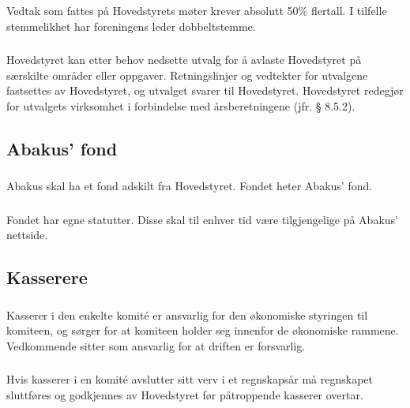 \subsubsection{}
Vedtak som fattes på Hovedstyrets møter krever absolutt 50\% flertall. I
tilfelle stemmelikhet har foreningens leder dobbeltstemme.

\subsubsection{}
Hovedstyret kan etter behov nedsette utvalg for å avlaste Hovedstyret på
særskilte områder eller oppgaver. Retningslinjer og vedtekter for utvalgene
fastsettes av Hovedstyret, og utvalget svarer til Hovedstyret. Hovedstyret
redegjør for utvalgets virksomhet i forbindelse med årsberetningene (jfr. §
8.5.2).

\subsection{Abakus’ fond}

\subsubsection{}
Abakus skal ha et fond adskilt fra Hovedstyret. Fondet heter Abakus’ fond.

\subsubsection{}
Fondet har egne statutter. Disse skal til enhver tid være tilgjengelige på
Abakus’ nettside.

\subsection{Kasserere}

\subsubsection{}
Kasserer i den enkelte komité er ansvarlig for den økonomiske styringen til
komiteen, og sørger for at komiteen holder seg innenfor de økonomiske rammene.
Vedkommende sitter som ansvarlig for at driften er forsvarlig.

\subsubsection{}
Hvis kasserer i en komité avslutter sitt verv i et regnskapsår må regnskapet
sluttføres og godkjennes av Hovedstyret før påtroppende kasserer overtar.

